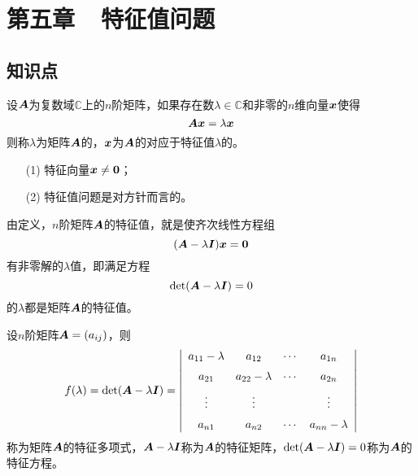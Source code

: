 \section{第五章~~特征值问题}

\subsection{知识点}


\begin{frame}
  
  \begin{dingyi}[特征值与特征向量]
    设$\boldsymbol{A}$为复数域$\mathbb C$上的$n$阶矩阵，如果存在数$\lambda\in\mathbb C$和非零的$n$维向量${\boldsymbol{x}}$使得
    $$
    \boldsymbol{A}{\boldsymbol{x}}=\lambda{\boldsymbol{x}}
    $$
    则称$\lambda$为矩阵$\boldsymbol{A}$的，${\boldsymbol{x}}$为$\boldsymbol{A}$的对应于特征值$\lambda$的。
  \end{dingyi}  

  \begin{itemize}
  \item[(1)] 特征向量$\vx\ne\M0$；
  \item[(2)] 特征值问题是对方针而言的。 
  \end{itemize}
  
\end{frame}


\begin{frame}
  
  由定义，$n$阶矩阵$\boldsymbol{A}$的特征值，就是使齐次线性方程组
  $$
  (\MA-\lambda\MI)\vx=\M0
  $$
  有非零解的$\lambda$值，即满足方程
  $$
  \mathrm{det}(\boldsymbol{A}-\lambda\boldsymbol{I})=0
  $$
  的$\lambda$都是矩阵$\boldsymbol{A}$的特征值。


  
  
\end{frame}


\begin{frame}
  
  \begin{dingyi}
    设$n$阶矩阵$\boldsymbol{A}=(a_{ij})$，则
    $$
    f(\lambda)=\mathrm{det}(\boldsymbol{A}-\lambda\boldsymbol{I})
    =\left|
      \begin{array}{cccc}
        a_{11}- \lambda&a_{12}&\cdots&a_{1n}\\[0.2cm]
        a_{21}&a_{22}-\lambda&\cdots&a_{2n}\\[0.2cm]
        \vdots&\vdots&&\vdots\\[0.2cm]
        a_{n1}&a_{n2}&\cdots&a_{nn}-\lambda
      \end{array}
    \right|
    $$
    称为矩阵$\boldsymbol{A}$的特征多项式，$\boldsymbol{A}-\lambda\boldsymbol{I}$称为$\boldsymbol{A}$的特征矩阵，$\mathrm{det}(\boldsymbol{A}-\lambda\boldsymbol{I})=0$称为$\boldsymbol{A}$的特征方程。
  \end{dingyi}
  
  
\end{frame}

